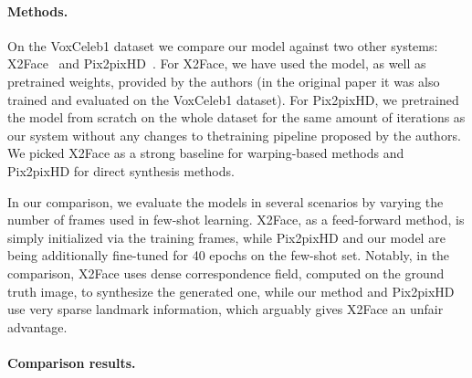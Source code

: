 \documentclass[10pt,twocolumn,letterpaper]{article}
\begin{document}
\paragraph{Methods.}

On the VoxCeleb1 dataset we compare our model against two other systems: X2Face~\cite{Wiles18} and Pix2pixHD~\cite{Wang18b}. For X2Face, we have used the model, as well as pretrained weights, provided by the authors (in the original paper it was also trained and evaluated on the VoxCeleb1 dataset). For Pix2pixHD, we pretrained the model from scratch on the whole dataset for the same amount of iterations as our system without any changes to thetraining pipeline proposed by the authors. We picked X2Face as a strong baseline for warping-based methods and Pix2pixHD for direct synthesis methods.

In our comparison, we evaluate the models in several scenarios by varying the number of frames  used in few-shot learning. X2Face, as a feed-forward method, is simply initialized via the training frames, while Pix2pixHD and our model are being additionally fine-tuned for 40 epochs on the few-shot set. Notably, in the comparison, X2Face uses dense correspondence field, computed on the ground truth image, to synthesize the generated one, while our method and Pix2pixHD use very sparse landmark information, which arguably gives X2Face an unfair advantage.

\paragraph{Comparison results.}
\end{document}
